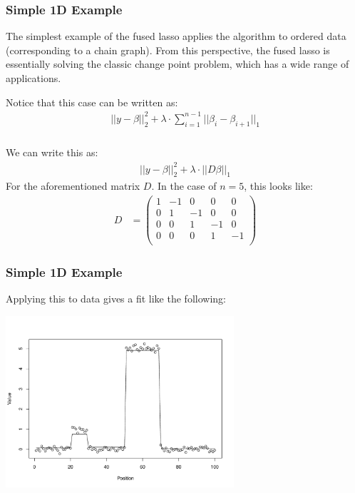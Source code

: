 \begin{frame}[fragile] \frametitle{}
  \frametitle{Simple 1D Example}
  \small

  The simplest example of the fused lasso applies the algorithm to ordered data (corresponding
  to a chain graph). From this perspective, the fused lasso is essentially solving the classic
  change point problem, which has a wide range of applications.

Notice that this case can be written as:
\begin{align*}
|| y - \beta ||_2^2 + \lambda \cdot \sum_{i=1}^{n-1} || \beta_{i} - \beta_{i+1} ||_1
\end{align*}

\end{frame}

\begin{frame}[fragile] \frametitle{}

We can write this as:
\begin{align*}
|| y - \beta ||_2^2 + \lambda \cdot || D \beta ||_1
\end{align*}
For the aforementioned matrix $D$. In the case of $n=5$, this looks like:
\begin{align*}
D &= \left(\begin{array}{ccccc}
1 & -1 & 0 & 0 & 0\\
0 & 1 & -1 & 0 & 0\\
0 & 0 & 1 & -1 & 0\\
0 & 0 & 0 & 1 & -1\\
\end{array}\right)
\end{align*}

\end{frame}

\begin{frame}
  \frametitle{Simple 1D Example}
  \small

  Applying this to data gives a fit like the following:
  \vspace{-0.3in}

  \begin{center}
  \includegraphics[height=2.5in]{img/simple_fused}
  \end{center}

\end{frame}


